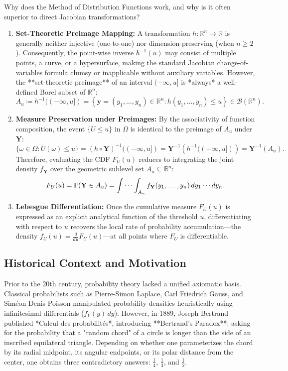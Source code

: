 \documentclass[11pt, letterpaper]{article}
\theoremstyle{definition}
\theoremstyle{remark}
\newcommand{\R}{\mathbb{R}}
\newcommand{\Prob}{\mathbb{P}}
\begin{document}
Why does the Method of Distribution Functions work, and why is it often superior to direct Jacobian transformations?
\begin{enumerate}
    \item \textbf{Set-Theoretic Preimage Mapping:} A transformation $h : \R^n \to \R$ is generally neither injective (one-to-one) nor dimension-preserving (when $n \ge 2$). Consequently, the point-wise inverse $h^{-1}(u)$ may consist of multiple points, a curve, or a hypersurface, making the standard Jacobian change-of-variables formula clumsy or inapplicable without auxiliary variables. However, the **set-theoretic preimage** of an interval $(-\infty, u]$ is *always* a well-defined Borel subset of $\R^n$:
    \[
        A_u \coloneqq h^{-1}((-\infty, u]) = \left\{ \mathbf{y} = (y_1, \dots, y_n) \in \R^n : h(y_1, \dots, y_n) \le u \right\} \in \mathcal{B}(\R^n).
    \]
    \item \textbf{Measure Preservation under Preimages:} By the associativity of function composition, the event $\{U \le u\}$ in $\Omega$ is identical to the preimage of $A_u$ under $\mathbf{Y}$:
    \[
        \{\omega \in \Omega : U(\omega) \le u\} = (h \circ \mathbf{Y})^{-1}((-\infty, u]) = \mathbf{Y}^{-1}\left(h^{-1}((-\infty, u])\right) = \mathbf{Y}^{-1}(A_u).
    \]
    Therefore, evaluating the CDF $F_U(u)$ reduces to integrating the joint density $f_{\mathbf{Y}}$ over the geometric sublevel set $A_u \subseteq \R^n$:
    \[
        F_U(u) = \Prob(\mathbf{Y} \in A_u) = \idotsint_{A_u} f_{\mathbf{Y}}(y_1, \dots, y_n) \, dy_1 \cdots dy_n.
    \]
    \item \textbf{Lebesgue Differentiation:} Once the cumulative measure $F_U(u)$ is expressed as an explicit analytical function of the threshold $u$, differentiating with respect to $u$ recovers the local rate of probability accumulation—the density $f_U(u) = \frac{d}{du}F_U(u)$—at all points where $F_U$ is differentiable.
\end{enumerate}

\subsection{Historical Context and Motivation}

Prior to the 20th century, probability theory lacked a unified axiomatic basis. Classical probabilists such as Pierre-Simon Laplace, Carl Friedrich Gauss, and Sim\'{e}on Denis Poisson manipulated probability densities heuristically using infinitesimal differentials ($f_Y(y)\,dy$). However, in 1889, Joseph Bertrand published *Calcul des probabilit\'{e}s*, introducing **Bertrand's Paradox**: asking for the probability that a "random chord" of a circle is longer than the side of an inscribed equilateral triangle. Depending on whether one parameterizes the chord by its radial midpoint, its angular endpoints, or its polar distance from the center, one obtains three contradictory answers: $\frac{1}{4}$, $\frac{1}{3}$, and $\frac{1}{2}$.
\end{document}
